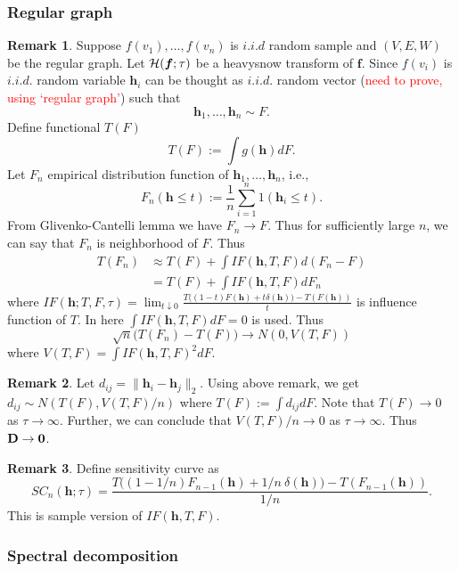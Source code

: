 \documentclass[preprint, review, 12pt]{article}
\theoremstyle{definition}
\newtheorem{rmk}{Remark}[section]
\theoremstyle{remark}
\begin{document}
\subsubsection{Regular graph}
\begin{rmk}
Suppose $f(v_1),\dots,f(v_n)$ is $i.i.d$ random sample and $(V,E,W)$ be the regular graph. Let ${\cal H}(\boldsymbol{f};\tau)$ be a heavysnow transform of ${\boldsymbol f}$. Since $f(v_i)$ is $i.i.d.$ random variable ${\boldsymbol h}_i$ can be thought as $i.i.d.$ random vector (\textcolor{red}{need to prove, using `regular graph'}) such that 
\[
{\boldsymbol h}_1,\dots,{\boldsymbol h}_n \sim F.
\] 
Define functional $T(F)$
\[
T(F):=\int g({\boldsymbol h}) dF.
\]
Let $F_n$ empirical distribution function of ${\boldsymbol h}_1,\dots,{\boldsymbol h}_n$, i.e., 
\[
F_n({\boldsymbol h}\leq t ) :=\frac{1}{n}\sum_{i=1}^{n}1({\boldsymbol h}_i\leq t).
\]
From Glivenko-Cantelli lemma we have $F_n \to F$. Thus for sufficiently large $n$, we can say that $F_n$ is neighborhood of $F$. Thus 
\begin{align*}
T(F_n) & \approx  T(F)+\int IF(\boldsymbol{h},T,F)d(F_n-F) \\
& = T(F)+\int IF(\boldsymbol{h},T,F) dF_n
\end{align*}
where $IF({\boldsymbol h}; T,F,\tau)= \lim_{t\downarrow 0}\frac{T\big((1-t)F(\boldsymbol{h}) + t \delta(\boldsymbol{h}) \big)-T(F(\boldsymbol{h}))}{t}$ is influence function of $T$. In here $\int IF(\boldsymbol{h},T,F)dF=0$ is used. Thus 
\[
\sqrt{n}\Big(T(F_n)-T(F) \Big) \to N(0,V(T,F))
\]
where $V(T,F)=\int IF(\boldsymbol{h},T,F)^2 dF$.
\end{rmk}

\begin{rmk}
Let $d_{ij}=\|{\boldsymbol h}_i-{\boldsymbol h}_j\|_2$. Using above remark, we get $d_{ij} \sim N(T(F),V(T,F)/n)$ where $T(F):=\int d_{ij}dF$. Note that $T(F) \to 0 $ as $\tau \to \infty$. Further, we can conclude that $V(T,F)/n \to 0$ as $\tau \to \infty$. Thus ${\bf D} \to {\bf 0}$. 
\end{rmk}

\begin{rmk}
Define sensitivity curve as 
\[
SC_{n}({\boldsymbol h};\tau)= \frac{T\big((1-1/n)F_{n-1}(\boldsymbol{h}) + 1/n ~ \delta(\boldsymbol{h}) \big)-T(F_{n-1}(\boldsymbol{h}))}{1/n}.
\]
This is sample version of $IF({\boldsymbol h},T,F)$.
\end{rmk}

\subsubsection{Spectral decomposition}
\end{document}
